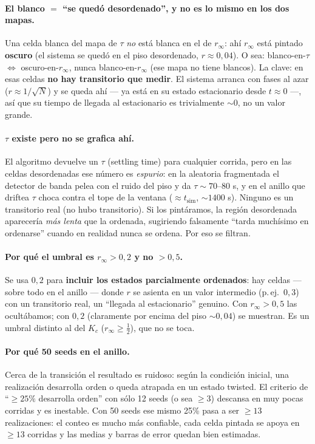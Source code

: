 \documentclass[11pt,a4paper]{article}
\begin{document}
\paragraph{El blanco $=$ ``se quedó desordenado'', y no es lo mismo en los dos mapas.}
Una celda blanca del mapa de $\tau$ \emph{no} está blanca en el de $r_\infty$: ahí
$r_\infty$ está pintado \textbf{oscuro} (el sistema se quedó en el piso
desordenado, $r \approx 0{,}04$). O sea: blanco-en-$\tau$ $\Leftrightarrow$
oscuro-en-$r_\infty$, nunca blanco-en-$r_\infty$ (ese mapa no tiene blancos). La
clave: en esas celdas \textbf{no hay transitorio que medir}. El sistema arranca
con fases al azar ($r \approx 1/\sqrt N$) y se queda ahí --- ya está en su estado
estacionario desde $t \approx 0$ ---, así que su tiempo de llegada al estacionario
es trivialmente $\sim 0$, no un valor grande.

\paragraph{$\tau$ existe pero no se grafica ahí.}
El algoritmo devuelve un $\tau$ (settling time) para cualquier corrida, pero en las
celdas desordenadas ese número es \emph{espurio}: en la aleatoria fragmentada el
detector de banda pelea con el ruido del piso y da $\tau \sim 70$--$80$ s, y en el
anillo que driftea $\tau$ choca contra el tope de la ventana
($\approx t_{\text{sim}}$, $\sim 1400$ s). Ninguno es un transitorio real (no hubo
transitorio). Si los pintáramos, la región desordenada aparecería \emph{más lenta}
que la ordenada, sugiriendo falsamente ``tarda muchísimo en ordenarse'' cuando en
realidad nunca se ordena. Por eso se filtran.

\paragraph{Por qué el umbral es $r_\infty > 0{,}2$ y no $> 0{,}5$.}
Se usa $0{,}2$ para \textbf{incluir los estados parcialmente ordenados}: hay celdas
--- sobre todo en el anillo --- donde $r$ se asienta en un valor intermedio
(p.\,ej.\ $0{,}3$) con un transitorio real, un ``llegada al estacionario''
genuino. Con $r_\infty > 0{,}5$ las ocultábamos; con $0{,}2$ (claramente por encima
del piso $\sim 0{,}04$) se muestran. Es un umbral distinto al del $K_c$
($r_\infty \ge \tfrac12$), que no se toca.

\paragraph{Por qué 50 seeds en el anillo.}
Cerca de la transición el resultado es ruidoso: según la condición inicial, una
realización desarrolla orden o queda atrapada en un estado twisted. El criterio de
``$\ge 25\%$ desarrolla orden'' con sólo 12 seeds (o sea $\ge 3$) descansa en muy
pocas corridas y es inestable. Con 50 seeds ese mismo 25\% pasa a ser $\ge 13$
realizaciones: el conteo es mucho más confiable, cada celda pintada se apoya en
$\ge 13$ corridas y las medias y barras de error quedan bien estimadas.
\end{document}
